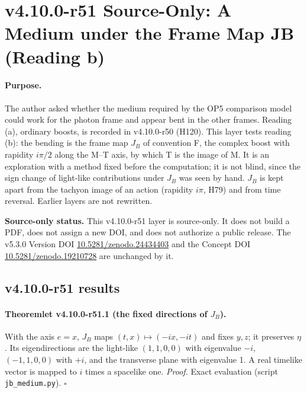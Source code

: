 \clearpage
\section*{v4.10.0-r51 Source-Only: A Medium under the Frame Map JB (Reading b)}
\label{sec:v4100-r51-jb-medium}

\paragraph{Purpose.}
The author asked whether the medium required by the OP5 comparison model could work for the photon frame and appear bent in the other
frames.  Reading (a), ordinary boosts, is recorded in v4.10.0-r50 (H120).  This layer tests reading (b): the bending is the frame map \(J_B\) of
convention F, the complex boost with rapidity \(i\pi/2\) along the M--T axis, by which T is the image of M.  It is an exploration with a method fixed
before the computation; it is not blind, since the sign change of light-like contributions under \(J_B\) was seen by hand.  \(J_B\) is kept apart from the
tachyon image of an action (rapidity \(i\pi\), H79) and from time reversal.  Earlier layers are not rewritten.

\noindent\textbf{Source-only status.}
This v4.10.0-r51 layer is source-only.  It does not build a PDF, does not assign a new DOI,
and does not authorize a public release.  The v5.3.0 Version DOI
\href{https://doi.org/10.5281/zenodo.24434403}{10.5281/zenodo.24434403} and the Concept DOI
\href{https://doi.org/10.5281/zenodo.19210728}{10.5281/zenodo.19210728} are unchanged by it.

\subsection*{v4.10.0-r51 results}
\label{subsec:v4100-r51-results}

\paragraph{Theoremlet v4.10.0-r51.1 (the fixed directions of \(J_B\)).}
With the axis \(e=x\), \(J_B\) maps \((t,x)\mapsto(-ix,-it)\) and fixes \(y,z\); it preserves \(\eta\).  Its eigendirections are the light-like \((1,1,0,0)\) with eigenvalue \(-i\), \((-1,1,0,0)\)
with \(+i\), and the transverse plane with eigenvalue 1.  A real timelike vector is mapped to \(i\) times a spacelike one.
\emph{Proof.} Exact evaluation (script \texttt{jb\_\allowbreak medium.py}).  \(\square\)

